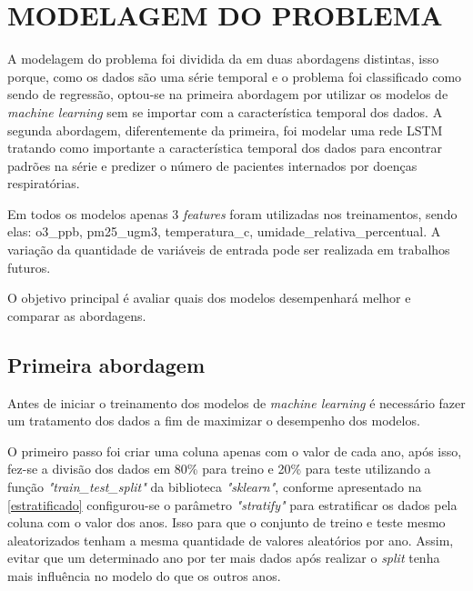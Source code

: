 \documentclass[
  12pt,		%
  a4paper,	%
  openright,%
  oneside,	%
  chapter=TITLE,		%
  section=TITLE,		%
  english,	%
  french,	%
  spanish,	%
  brazil	%
]{abntex2}
\begin{document}
    \section{MODELAGEM DO PROBLEMA}

    A modelagem do problema foi dividida da em duas abordagens distintas, isso porque, como os dados 
    são uma série temporal e o problema foi classificado como sendo de regressão, optou-se na primeira abordagem por
    utilizar os modelos de \textit{machine learning} sem se importar com a característica temporal dos dados. A segunda
    abordagem, diferentemente da primeira, foi modelar uma rede LSTM tratando como importante a característica temporal
    dos dados para encontrar padrões na série e predizer o número de pacientes internados por doenças respiratórias.

    Em todos os modelos apenas 3 \textit{features} foram utilizadas nos treinamentos, sendo elas:
    o3\_ppb, pm25\_ugm3, temperatura\_c, umidade\_relativa\_percentual. A variação da quantidade de variáveis
    de entrada pode ser realizada em trabalhos futuros.

    O objetivo principal é avaliar quais dos modelos desempenhará melhor e comparar as abordagens.

    \subsection{Primeira abordagem}
    Antes de iniciar o treinamento dos modelos de \textit{machine learning} é necessário fazer um tratamento dos
    dados a fim de maximizar o desempenho dos modelos.

    O primeiro passo foi criar uma coluna apenas com o valor de cada ano, após isso, fez-se a divisão
    dos dados em 80\% para treino e 20\% para teste utilizando a função \textit{"train\_test\_split"} da biblioteca
    \textit{"sklearn"}, conforme apresentado na \ref*{estratificado} configurou-se o parâmetro \textit{"stratify"} para estratificar os dados
    pela coluna com o valor dos anos. Isso para que o conjunto de treino e teste mesmo aleatorizados tenham a mesma
    quantidade de valores aleatórios por ano. Assim, evitar que um determinado ano por ter mais dados após realizar o \textit{split}
    tenha mais influência no modelo do que os outros anos.
\end{document}
